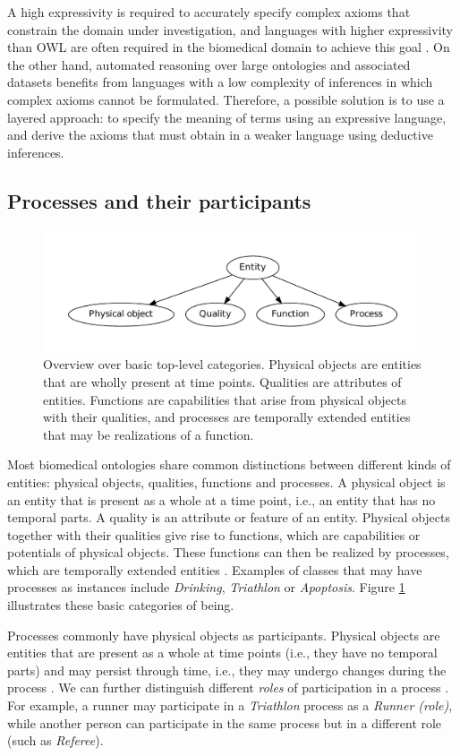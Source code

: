 \documentclass{bioinfo}
\renewcommand{\cite}{\citep}
\begin{document}
A high expressivity is required to accurately specify complex axioms
that constrain the domain under investigation, and languages with
higher expressivity than OWL are often required in the biomedical
domain to achieve this goal \cite{Hoehndorf2009sequences, rnao}. On
the other hand, automated reasoning over large ontologies and
associated datasets benefits from languages with a low complexity of
inferences in which complex axioms cannot be formulated. Therefore, a
possible solution is to use a layered approach: to specify the meaning
of terms using an expressive language, and derive the axioms that
must obtain in a weaker language using deductive inferences.

\subsection{Processes and their participants}
\begin{figure}
  \centering
  \includegraphics[width=.45\textwidth]{onto.pdf}
  \caption{Overview over basic top-level categories. Physical objects
    are entities that are wholly present at time points. Qualities are
    attributes of entities. Functions are capabilities that arise from
    physical objects with their qualities, and processes are
    temporally extended entities that may be realizations of a
    function.\label{fig:onto}}
\end{figure}

Most biomedical ontologies share common distinctions between different
kinds of entities: physical objects, qualities, functions and
processes. A physical object is an entity that is present as a whole
at a time point, i.e., an entity that has no temporal parts. A quality
is an attribute or feature of an entity. Physical objects together
with their qualities give rise to functions, which are capabilities or
potentials of physical objects. These functions can then be realized
by processes, which are temporally extended entities
\cite{Burek2006}. Examples of classes that may have processes as
instances include {\em Drinking}, {\em Triathlon} or {\em Apoptosis}.
Figure \ref{fig:onto} illustrates these basic categories of being.

Processes commonly have physical objects as participants. Physical
objects are entities that are present as a whole at time points (i.e.,
they have no temporal parts) and may persist through time, i.e., they
may undergo changes during the process \cite{Herre2006, Herre2010}.
We can further distinguish different {\em roles} of participation in a
process \cite{Loebe2007}. For example, a runner may participate in a
{\em Triathlon} process as a {\em Runner (role)}, while another person
can participate in the same process but in a different role (such as
{\em Referee}).
\end{document}

